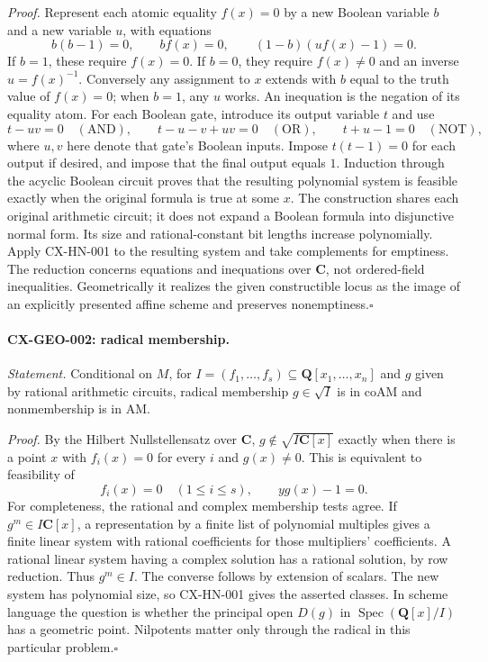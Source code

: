 \emph{Proof.} Represent each atomic equality $f(x)=0$ by a new Boolean
variable $b$ and a new variable $u$, with equations
\[
 b(b-1)=0,\qquad bf(x)=0,\qquad (1-b)(u f(x)-1)=0.
\]
If $b=1$, these require $f(x)=0$. If $b=0$, they require $f(x)\ne0$
and an inverse $u=f(x)^{-1}$. Conversely any assignment to $x$ extends
with $b$ equal to the truth value of $f(x)=0$; when $b=1$, any $u$ works.
An inequation is the negation of its equality atom.
For each Boolean gate, introduce its output variable $t$ and use
\[
 t-uv=0\quad(\mathrm{AND}),\qquad
 t-u-v+uv=0\quad(\mathrm{OR}),\qquad
 t+u-1=0\quad(\mathrm{NOT}),
\]
where $u,v$ here denote that gate's Boolean inputs. Impose $t(t-1)=0$
for each output if desired, and impose that the final output equals $1$.
Induction through the acyclic Boolean circuit proves that the resulting
polynomial system is feasible exactly when the original formula is true
at some $x$. The construction shares each original arithmetic circuit;
it does not expand a Boolean formula into disjunctive normal form.
Its size and rational-constant bit lengths increase polynomially.
Apply CX-HN-001 to the resulting system and take complements for emptiness.
The reduction concerns equations and inequations over $\mathbf C$, not
ordered-field inequalities. Geometrically it realizes the given constructible
locus as the image of an explicitly presented affine scheme and preserves
nonemptiness.\hfill$\square$

\paragraph{CX-GEO-002: radical membership.}
\emph{Statement.} Conditional on $M$, for
$I=(f_1,\ldots,f_s)\subseteq\mathbf Q[x_1,\ldots,x_n]$ and $g$ given
by rational arithmetic circuits, radical membership $g\in\sqrt I$ is in
$\mathrm{coAM}$ and nonmembership is in $\mathrm{AM}$.

\emph{Proof.} By the Hilbert Nullstellensatz over $\mathbf C$,
$g\notin\sqrt{I\mathbf C[x]}$ exactly when there is a point $x$ with
$f_i(x)=0$ for every $i$ and $g(x)\ne0$. This is equivalent to feasibility of
\[
               f_i(x)=0\quad(1\leq i\leq s),\qquad y g(x)-1=0.
\]
For completeness, the rational and complex membership tests agree. If
$g^m\in I\mathbf C[x]$, a representation by a finite list of polynomial
multiples gives a finite linear system with rational coefficients for those
multipliers' coefficients. A rational linear system having a complex solution
has a rational solution, by row reduction. Thus $g^m\in I$. The converse
follows by extension of scalars. The new system has polynomial size, so
CX-HN-001 gives the asserted classes. In scheme language the question is
whether the principal open $D(g)$ in $\operatorname{Spec}(\mathbf Q[x]/I)$
has a geometric point. Nilpotents matter only through the radical in this
particular problem.\hfill$\square$

